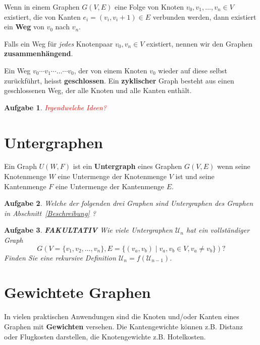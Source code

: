 \documentclass[12pt,a4paper]{report}
\theoremstyle{break}
\newtheorem{exercise}{Aufgabe}[section]
\theoremstyle{plain}
\begin{document}
Wenn in einem Graphen $G(V,E)$ eine Folge von Knoten $v_0, v_1,
\ldots, v_n \in V$ existiert, die von Kanten $e_i = (v_i, v_i+1) \in
E$ verbunden werden, dann existiert ein \textbf{Weg} von $v_0$ nach
$v_n$. 

Falls ein Weg f\"{u}r \emph{jedes} Knotenpaar $v_0, v_n
\in V$ existiert, nennen wir den Graphen \textbf{zusammenh\"{a}ngend}.

Ein Weg $v_0\cdots{v_1}\cdots\ldots\cdots{v_0}$, der von einem Knoten
$v_0$ wieder auf diese selbst zur\"{u}ckf\"{u}hrt, heisst
\textbf{geschlossen}. Ein \textbf{zyklischer} Graph besteht aus einen
geschlossenen Weg, der alle Knoten und alle Kanten enth\"{a}lt.

\begin{exercise}
\textcolor{red}{Irgendwelche Ideen?}
\end{exercise}

\section{Untergraphen}

Ein Graph $U(W,F)$ ist ein \textbf{Untergraph} eines Graphen $G(V,E)$
wenn seine Knotenmenge $W$ eine Untermenge der Knotenmenge $V$ ist und
seine Kantenmenge $F$ eine Untermenge der Kantenmenge $E$.

\begin{exercise}\label{exunter}
Welche der folgenden drei Graphen sind Untergraphen des Graphen in
Abschnitt~\ref{Beschreibung} ?


\end{exercise}
\begin{exercise}
\textbf{FAKULTATIV} Wie viele Untergraphen $\mathcal{U}_n$ hat ein
\emph{vollst\"{a}ndiger} Graph 
\[ 
G(V = \{v_1, v_2, \ldots, v_n\}, E = \{(v_a, v_b) \mid v_a, v_b \in V,
v_a \neq v_b\}) ?
\] 
Finden Sie eine rekursive Definition $\mathcal{U}_n = f(\mathcal{U}_{n-1})$.
\end{exercise}

\newpage
\section{Gewichtete Graphen}
\label{gewichtet}

In vielen praktischen Anwendungen sind die Knoten und/oder Kanten
eines Graphen mit \textbf{Gewichten} versehen. Die Kantengewichte k\"{o}nnen
z.B. Distanz oder Flugkosten darstellen, die Knotengewichte
z.B. Hotelkosten.
\end{document}
